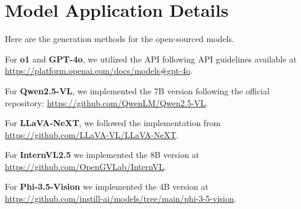\section{Model Application Details}
\label{appendix:sec:model_detail}

Here are the generation methods for the open-sourced models.

For \textbf{o1} and \textbf{GPT-4o}, we utilized the API following API guidelines available at \url{https://platform.openai.com/docs/models#gpt-4o}. 

For \textbf{Qwen2.5-VL}, we implemented the 7B version following the official repository: \url{https://github.com/QwenLM/Qwen2.5-VL}. 

For \textbf{LLaVA-NeXT}, we followed the implementation from \url{https://github.com/LLaVA-VL/LLaVA-NeXT}. 

For \textbf{InternVL2.5} we implemented the 8B version at \url{https://github.com/OpenGVLab/InternVL}.

For \textbf{Phi-3.5-Vision} we implemented the 4B version at \url{https://github.com/instill-ai/models/tree/main/phi-3-5-vision}.
